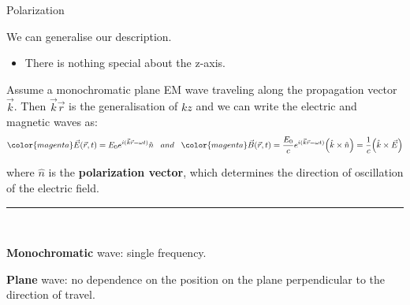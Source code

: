 %
%
%

\begin{frame}{Polarization}

We can generalise our description.
\begin{itemize}
     \item There is nothing special about the z-axis.
\end{itemize}

\vspace{0.2cm}

Assume a monochromatic plane EM wave traveling along the
propagation vector $\vec{k}$.
Then $\vec{k} \vec{r}$ is the generalisation of $kz$ and we can write the electric
and magnetic waves as:
\begin{equation*}
     {\color{magenta} \vec{E}(\vec{r},t) = E_0  e^{i (\vec{k} \vec{r} -\omega t)} \hat{n} }
     \;\;\; and \;\;\;
     {\color{magenta}
           \vec{B}(\vec{r},t) =
                \frac{E_0}{c}  e^{i ( \vec{k} \vec{r} -\omega t)} \Big( \hat{k} \times \hat{n} \Big) =
                \frac{1}{c}  \Big( \hat{k} \times \vec{E} \Big)
     }
\end{equation*}

where $\hat{n}$ is the {\bf polarization vector}, which determines the direction of oscillation of
the electric field.

\noindent\rule{2cm}{0.4pt}\\
{
\begin{itemize}
{\small
    \item {\bf Monochromatic} wave: single frequency.
    \item {\bf Plane} wave: no dependence on the position on the plane perpendicular to the direction of travel.
}
\end{itemize}
}

\end{frame}

%
%
%

